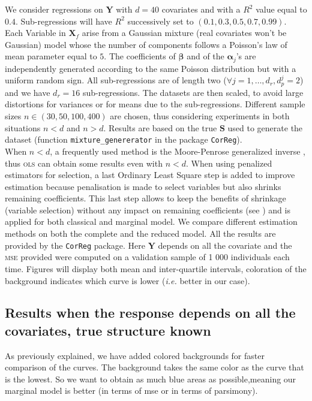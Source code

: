 \documentclass[12pt,a4paper]{report}
\begin{document}
We consider regressions on $\boldsymbol{Y}$ with $d=40$ covariates and with a $R^2$ value equal to $0.4$. Sub-regressions will have $R^2$ successively set to $(0.1,0.3,0.5,0.7,0.99)$. Each Variable in $\boldsymbol{X}_f$ arise from a Gaussian mixture (real covariates won't be Gaussian) model whose the number of components follows a Poisson's law of mean parameter equal to $5$. The coefficients of $\boldsymbol{\beta}$ and of the $\boldsymbol{\alpha}_j$'s are independently generated according to the same Poisson distribution but with a uniform random sign. All sub-regressions are of length two ($\forall j=1,\ldots,d_r, d_p^j=2$) and we have $d_r=16$ sub-regressions. The datasets are then scaled, to avoid large distortions for variances or for means due to the sub-regressions.	Different sample sizes  $n\in (30,50,100,400)$ are chosen, thus considering experiments in both situations $n<d$ and $n>d$. 
	Results are based on the true $\boldsymbol{S}$ used to generate the dataset (function {\tt mixture\_genererator} in the package {\tt CorReg}).\\
	
	When $n<d$, a frequently used method is the Moore-Penrose \cite{katsikis2008fast} generalized inverse , thus \textsc{ols} can obtain some results even with $n<d$. %
	When using penalized estimators for selection, a last Ordinary Least Square step is added to improve estimation because penalisation is made to select variables but also shrinks remaining coefficients. This last step allows to keep the benefits of shrinkage (variable selection) without any impact on remaining coefficients (see \cite{SAM10088}) and is applied for both classical and marginal model.
	We compare different estimation methods on both the complete and the reduced model. All the results are provided by the {\tt CorReg} package. Here $\boldsymbol{Y}$ depends on all the covariate and the \textsc{mse} provided were computed on a validation sample of 1 000 individuals each time. Figures will display both mean and inter-quartile intervals, coloration of the background indicates which curve is lower ({\it i.e.} better in our case). \\
	\subsection{Results when the response depends on all the covariates, true structure known}	
	As previously explained, we have added colored backgrounds for faster comparison of the curves. The background takes the same color as the curve that is the lowest. So we want to obtain as much blue areas as possible,meaning our marginal model is better (in terms of {\sc mse} or in terms of parsimony).
\end{document}
